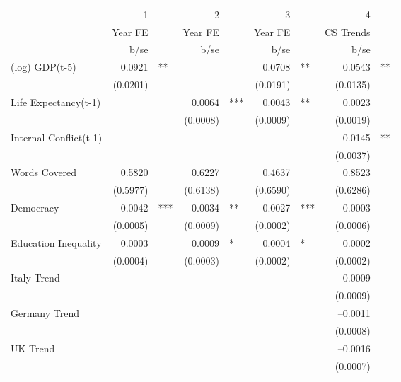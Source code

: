 \begin{tabular} {l* {4}{r @{} l}}
\hline
            &           1&   &           2&   &           3&   &           4&   \\
            &     Year FE&   &     Year FE&   &     Year FE&   &   CS Trends&   \\
            &        b/se&   &        b/se&   &        b/se&   &        b/se&   \\
\hline
(log) GDP(t-5)&      0.0921&** &            &   &      0.0708&** &      0.0543&** \\
            &    (0.0201)&   &            &   &    (0.0191)&   &    (0.0135)&   \\
Life Expectancy(t-1) &            &   &      0.0064&***&      0.0043&** &      0.0023&   \\
            &            &   &    (0.0008)&   &    (0.0009)&   &    (0.0019)&   \\
Internal Conflict(t-1)&            &   &            &   &            &   &    --0.0145&** \\
            &            &   &            &   &            &   &    (0.0037)&   \\
Words Covered&      0.5820&   &      0.6227&   &      0.4637&   &      0.8523&   \\
            &    (0.5977)&   &    (0.6138)&   &    (0.6590)&   &    (0.6286)&   \\
Democracy   &      0.0042&***&      0.0034&** &      0.0027&***&    --0.0003&   \\
            &    (0.0005)&   &    (0.0009)&   &    (0.0002)&   &    (0.0006)&   \\
Education Inequality&      0.0003&   &      0.0009&*  &      0.0004&*  &      0.0002&   \\
            &    (0.0004)&   &    (0.0003)&   &    (0.0002)&   &    (0.0002)&   \\
Italy Trend &            &   &            &   &            &   &    --0.0009&   \\
            &            &   &            &   &            &   &    (0.0009)&   \\
Germany Trend&            &   &            &   &            &   &    --0.0011&   \\
            &            &   &            &   &            &   &    (0.0008)&   \\
UK Trend    &            &   &            &   &            &   &    --0.0016&   \\
            &            &   &            &   &            &   &    (0.0007)&   \\

\end{tabular}
